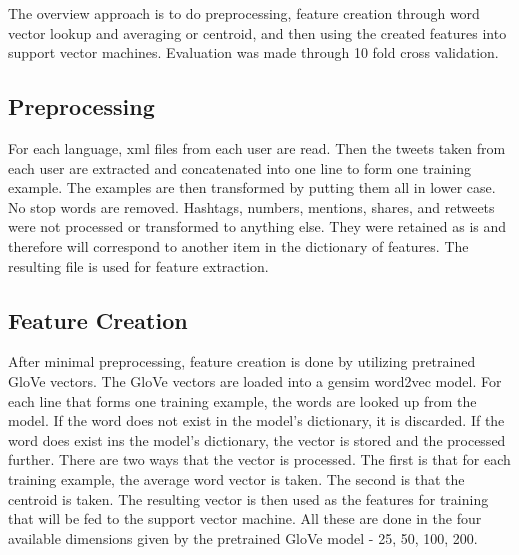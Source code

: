 \documentclass[a4paper]{llncs}
\begin{document}
The overview approach is to do preprocessing, feature creation through word vector lookup and averaging or centroid, and then using the created features  into support vector machines. Evaluation was made through 10 fold cross validation.



\subsection{Preprocessing}
For each language, xml files from each user are read. Then the tweets taken from each user are extracted and concatenated into one line to form one training example. The examples are then transformed by putting them all in lower case. No stop words are removed. Hashtags, numbers, mentions, shares, and retweets were not processed or transformed to anything else. They were retained as is and therefore will correspond to another item in the dictionary of features. The resulting file is used for feature extraction. 

\subsection{Feature Creation}
After minimal preprocessing, feature creation is done by utilizing pretrained GloVe vectors. The GloVe vectors are loaded into a gensim word2vec model. For each line that forms one training example, the words are looked up from the model. If the word does not exist in the model's dictionary, it is discarded. If the word does exist ins the model's dictionary, the vector is stored and the processed further. There are two ways that the vector is processed. The first is that for each training example, the average word vector is taken. The second is that the centroid is taken. The resulting vector is then used as the features for training that will be fed to the support vector machine.  All these are done in the four available dimensions given by the pretrained GloVe model - 25, 50, 100, 200. 
\end{document}
